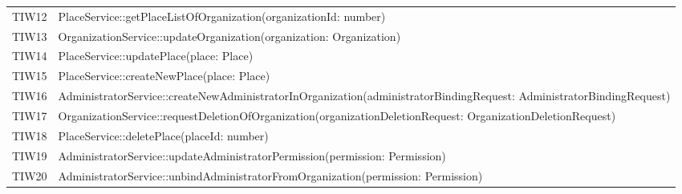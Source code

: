 {\begin{longtable}{C{2cm} C{12cm}}
	TIW12 & PlaceService::getPlaceListOfOrganization(organizationId: number)\\
	TIW13 & OrganizationService::updateOrganization(organization: Organization)\\
	TIW14 & PlaceService::updatePlace(place: Place)\\
	TIW15 & PlaceService::createNewPlace(place: Place)\\
	TIW16 & AdministratorService::createNewAdministratorInOrganization(administratorBindingRequest: AdministratorBindingRequest)\\
	TIW17 & OrganizationService::requestDeletionOfOrganization(organizationDeletionRequest: OrganizationDeletionRequest)\\
	TIW18 & PlaceService::deletePlace(placeId: number)\\
	TIW19 & AdministratorService::updateAdministratorPermission(permission: Permission)\\
	TIW20 & AdministratorService::unbindAdministratorFromOrganization(permission: Permission)\\


\end{longtable}
}